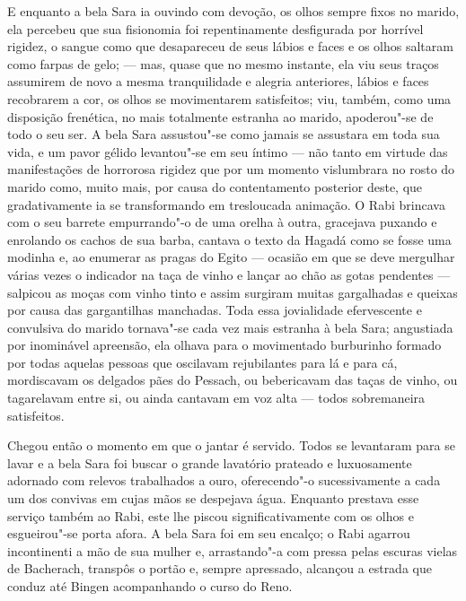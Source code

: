 E enquanto a bela Sara ia ouvindo com devoção, os olhos sempre fixos no
marido, ela percebeu que sua fisionomia foi repentinamente desfigurada
por horrível rigidez, o sangue como que desapareceu de seus lábios e
faces e os olhos saltaram como farpas de gelo; --- mas, quase que no
mesmo instante, ela viu seus traços assumirem de novo a mesma
tranquilidade e alegria anteriores, lábios e faces recobrarem a cor, os
olhos se movimentarem satisfeitos; viu, também, como uma disposição
frenética, no mais totalmente estranha ao marido, apoderou"-se de todo
o seu ser. A bela Sara assustou"-se como jamais se assustara em toda
sua vida, e um pavor gélido levantou"-se em seu íntimo --- não tanto em
virtude das manifestações de horrorosa rigidez que por um momento
vislumbrara no rosto do marido como, muito mais, por causa do
contentamento posterior deste, que gradativamente ia se transformando
em tresloucada animação. O Rabi brincava com o seu barrete
empurrando"-o de uma orelha à outra, gracejava puxando e enrolando os
cachos de sua barba, cantava o texto da Hagadá como se fosse uma
modinha e, ao enumerar as pragas do Egito --- ocasião em que se deve
mergulhar várias vezes o indicador na taça de vinho e lançar ao chão as
gotas pendentes --- salpicou as moças com vinho tinto e assim surgiram
muitas gargalhadas e queixas por causa das gargantilhas manchadas. Toda
essa jovialidade efervescente e convulsiva do marido tornava"-se cada
vez mais estranha à bela Sara; angustiada por inominável apreensão, ela
olhava para o movimentado burburinho formado por todas aquelas pessoas
que oscilavam rejubilantes para lá e para cá, mordiscavam os delgados
pães do Pessach, ou bebericavam das taças de vinho, ou tagarelavam
entre si, ou ainda cantavam em voz alta --- todos sobremaneira
satisfeitos.

Chegou então o momento em que o jantar é servido. Todos se levantaram
para se lavar e a bela Sara foi buscar o grande lavatório prateado e
luxuosamente adornado com relevos trabalhados a ouro, oferecendo"-o 
sucessivamente a cada um dos convivas em cujas mãos se despejava água.
Enquanto prestava esse serviço também ao Rabi, este lhe piscou
significativamente com os olhos e esgueirou"-se porta afora. A bela
Sara foi em seu encalço; o Rabi agarrou incontinenti a mão de sua
mulher e, arrastando"-a com pressa pelas escuras vielas de Bacherach,
transpôs o portão e, sempre apressado, alcançou a estrada que conduz
até Bingen acompanhando o curso do Reno.

